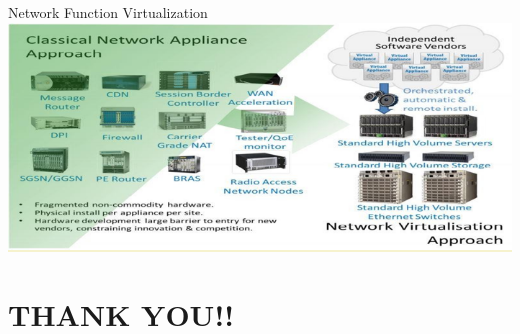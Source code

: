 \documentclass{SKP-beamer}
\begin{document}
  \begin{frame}{Network Function Virtualization}
 	\includegraphics[scale=0.9]{za.png}
 \end{frame}
 
 \section{\textbf{THANK YOU!!}}
\end{document}
